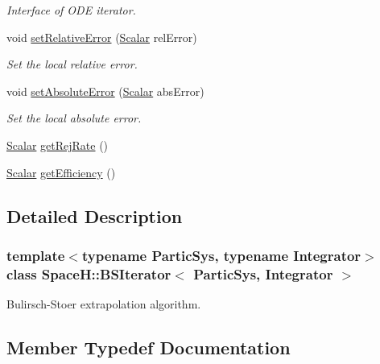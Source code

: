 \begin{DoxyCompactItemize}
\begin{DoxyCompactList}\small\item\em Interface of O\+DE iterator. \end{DoxyCompactList}\item 
void \mbox{\hyperlink{class_space_h_1_1_b_s_iterator_a8ac161c12bba12277bb9c881b692f60a}{set\+Relative\+Error}} (\mbox{\hyperlink{class_space_h_1_1_b_s_iterator_a89993409583b3022709bdfd84ea8149d}{Scalar}} rel\+Error)
\begin{DoxyCompactList}\small\item\em Set the local relative error. \end{DoxyCompactList}\item 
void \mbox{\hyperlink{class_space_h_1_1_b_s_iterator_a632afee18728553ba785f7b9468833e7}{set\+Absolute\+Error}} (\mbox{\hyperlink{class_space_h_1_1_b_s_iterator_a89993409583b3022709bdfd84ea8149d}{Scalar}} abs\+Error)
\begin{DoxyCompactList}\small\item\em Set the local absolute error. \end{DoxyCompactList}\item 
\mbox{\hyperlink{class_space_h_1_1_b_s_iterator_a89993409583b3022709bdfd84ea8149d}{Scalar}} \mbox{\hyperlink{class_space_h_1_1_b_s_iterator_a86345cb32e6cb2da0437a3697866501f}{get\+Rej\+Rate}} ()
\item 
\mbox{\hyperlink{class_space_h_1_1_b_s_iterator_a89993409583b3022709bdfd84ea8149d}{Scalar}} \mbox{\hyperlink{class_space_h_1_1_b_s_iterator_aac17462f691d6e8c1adee5d14f066e75}{get\+Efficiency}} ()
\end{DoxyCompactItemize}


\subsection{Detailed Description}
\subsubsection*{template$<$typename Partic\+Sys, typename Integrator$>$\newline
class Space\+H\+::\+B\+S\+Iterator$<$ Partic\+Sys, Integrator $>$}

Bulirsch-\/\+Stoer extrapolation algorithm. 

\subsection{Member Typedef Documentation}
\mbox{\label{class_space_h_1_1_b_s_iterator_a6f704f5db07202710306e6e334c99e2f}} 
